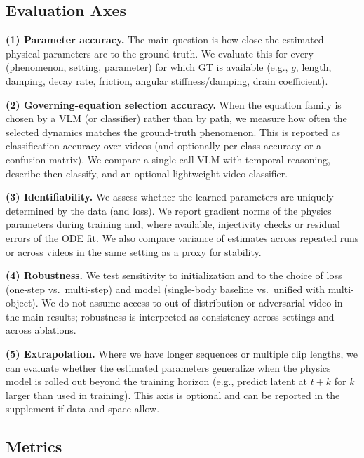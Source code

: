 \subsection{Evaluation Axes}
\label{sec:eval_axes}

\textbf{(1) Parameter accuracy.} The main question is how close the estimated physical parameters are to the ground truth. We evaluate this for every (phenomenon, setting, parameter) for which GT is available (e.g., $g$, length, damping, decay rate, friction, angular stiffness/damping, drain coefficient).

\textbf{(2) Governing-equation selection accuracy.} When the equation family is chosen by a VLM (or classifier) rather than by path, we measure how often the selected dynamics matches the ground-truth phenomenon. This is reported as classification accuracy over videos (and optionally per-class accuracy or a confusion matrix). We compare a single-call VLM with temporal reasoning, describe-then-classify, and an optional lightweight video classifier.

\textbf{(3) Identifiability.} We assess whether the learned parameters are uniquely determined by the data (and loss). We report gradient norms of the physics parameters during training and, where available, injectivity checks or residual errors of the ODE fit. We also compare variance of estimates across repeated runs or across videos in the same setting as a proxy for stability.

\textbf{(4) Robustness.} We test sensitivity to initialization and to the choice of loss (one-step vs.\ multi-step) and model (single-body baseline vs.\ unified with multi-object). We do not assume access to out-of-distribution or adversarial video in the main results; robustness is interpreted as consistency across settings and across ablations.

\textbf{(5) Extrapolation.} Where we have longer sequences or multiple clip lengths, we can evaluate whether the estimated parameters generalize when the physics model is rolled out beyond the training horizon (e.g., predict latent at $t+k$ for $k$ larger than used in training). This axis is optional and can be reported in the supplement if data and space allow.

\subsection{Metrics}
\label{sec:metrics}

